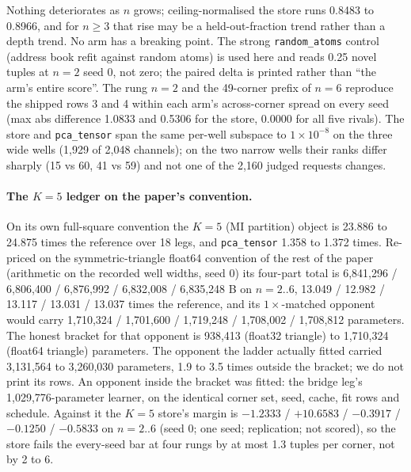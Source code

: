 \documentclass{article} %
\newcommand{\sci}[2]{\ensuremath{#1\times10^{#2}}}
\begin{document}
\noindent Nothing deteriorates as $n$ grows; ceiling-normalised the store runs 0.8483 to 0.8966,
and for $n\ge3$ that rise may be a held-out-fraction trend rather than a depth trend. No arm has a
breaking point. The strong \texttt{random\_atoms} control (address book refit against random
atoms) is used here and reads 0.25 novel tuples at $n=2$ seed 0, not zero; the paired delta is
printed rather than ``the arm's entire score''. %
The rung $n=2$ and the 49-corner prefix of $n=6$ reproduce the shipped rows 3 and 4 within each
arm's across-corner spread on every seed (max abs difference 1.0833 and 0.5306 for the store, 0.0000
for all five rivals). %
The store and \texttt{pca\_tensor} span the same per-well subspace to \sci{1}{-8} on the three wide
wells (1,929 of 2,048 channels); on the two narrow wells their ranks differ sharply (15 vs 60, 41 vs
59) and not one of the 2,160 judged requests changes. %

\paragraph{The $K=5$ ledger on the paper's convention.} On its own full-square convention the
$K=5$ (MI partition) object is 23.886 to 24.875 times the reference over 18 legs, and
\texttt{pca\_tensor} 1.358 to 1.372 times. %
Re-priced on the symmetric-triangle float64 convention of the rest of the paper (arithmetic on the
recorded well widths, seed 0) its four-part total is 6,841,296 / 6,806,400 / 6,876,992 / 6,832,008
/ 6,835,248 B on $n=2..6$, 13.049 / 12.982 / 13.117 / 13.031 / 13.037 times the reference, and its
$1\times$-matched opponent would carry 1,710,324 / 1,701,600 / 1,719,248 / 1,708,002 / 1,708,812
parameters. %
The honest bracket for that opponent is 938,413 (float32 triangle) to 1,710,324 (float64
triangle) parameters. The opponent the ladder actually fitted carried 3,131,564 to 3,260,030
parameters, 1.9 to 3.5 times outside the bracket; we do not print its rows.
An opponent inside the bracket was fitted: the bridge leg's 1,029,776-parameter learner, on the
identical corner set, seed, cache, fit rows and schedule. Against it the $K=5$ store's margin is
$-1.2333$ / $+10.6583$ / $-0.3917$ / $-0.1250$ / $-0.5833$ on $n=2..6$ (seed 0; one seed;
replication; not scored), so the store fails the every-seed bar at four rungs by at most 1.3 tuples
per corner, not by 2 to 6. %
\end{document}
